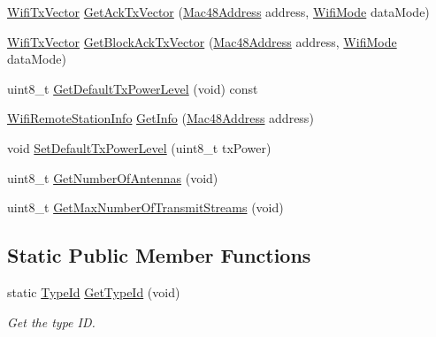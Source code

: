 \begin{DoxyCompactItemize}
\item 
\hyperlink{classns3_1_1WifiTxVector}{Wifi\+Tx\+Vector} \hyperlink{classns3_1_1WifiRemoteStationManager_ab04252f5a7892bfe9c1b690e2869ca9d}{Get\+Ack\+Tx\+Vector} (\hyperlink{classns3_1_1Mac48Address}{Mac48\+Address} address, \hyperlink{classns3_1_1WifiMode}{Wifi\+Mode} data\+Mode)
\item 
\hyperlink{classns3_1_1WifiTxVector}{Wifi\+Tx\+Vector} \hyperlink{classns3_1_1WifiRemoteStationManager_a178c4ab0c61a9e3b6072c1339c9880b3}{Get\+Block\+Ack\+Tx\+Vector} (\hyperlink{classns3_1_1Mac48Address}{Mac48\+Address} address, \hyperlink{classns3_1_1WifiMode}{Wifi\+Mode} data\+Mode)
\item 
uint8\+\_\+t \hyperlink{classns3_1_1WifiRemoteStationManager_acff2fc859ee6b4c66ea7a83dd075b5d6}{Get\+Default\+Tx\+Power\+Level} (void) const 
\item 
\hyperlink{classns3_1_1WifiRemoteStationInfo}{Wifi\+Remote\+Station\+Info} \hyperlink{classns3_1_1WifiRemoteStationManager_a82c4d3a97fc01fd7ffdd828f6292062d}{Get\+Info} (\hyperlink{classns3_1_1Mac48Address}{Mac48\+Address} address)
\item 
void \hyperlink{classns3_1_1WifiRemoteStationManager_ab8ab4668592ec11fce13ff41fbae4384}{Set\+Default\+Tx\+Power\+Level} (uint8\+\_\+t tx\+Power)
\item 
uint8\+\_\+t \hyperlink{classns3_1_1WifiRemoteStationManager_a6fe1a93cbc48862715bfa97dfe3b3830}{Get\+Number\+Of\+Antennas} (void)
\item 
uint8\+\_\+t \hyperlink{classns3_1_1WifiRemoteStationManager_ab80375f4b9334e9953ef55a2c5869699}{Get\+Max\+Number\+Of\+Transmit\+Streams} (void)
\end{DoxyCompactItemize}
\subsection*{Static Public Member Functions}
\begin{DoxyCompactItemize}
\item 
static \hyperlink{classns3_1_1TypeId}{Type\+Id} \hyperlink{classns3_1_1WifiRemoteStationManager_aa7dd9f0e5a1f929b1e330df7a25b7794}{Get\+Type\+Id} (void)
\begin{DoxyCompactList}\small\item\em Get the type ID. \end{DoxyCompactList}\end{DoxyCompactItemize}
